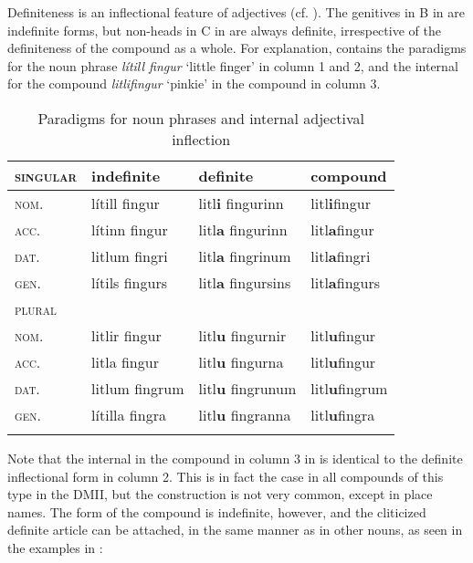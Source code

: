 \documentclass[output=paper]{LSP/langsci}
\begin{document}
\begin{xlist}
Definiteness is an inflectional feature of  adjectives (cf. ). The genitives in B in  are indefinite forms, but  non-heads in C in  are always definite, irrespective of the definiteness of the compound as a whole. For explanation,  contains the paradigms for the noun phrase \textit{lítill fingur} ‘little finger’ in column 1 and 2, and the internal  for the compound \textit{litlifingur} ‘pinkie’ in the compound in column 3. 

\begin{table}
\caption{Paradigms for noun phrases and internal adjectival inflection}
\label{tab:bjarnadottir:4}

\begin{tabularx}{\textwidth}{>{\scshape}lXXX}
\lsptoprule
\textup{singular} & indefinite & definite & compound\\
\midrule
nom. &  {lítill fingur} &  {litl}\textbf{{i}}  {fingurinn} 
&  {litl}\textbf{{i}}{fingur}\\
acc. &  {lítinn fingur} &  {litl}\textbf{{a}}  {fingurinn} 
&  {litl}\textbf{{a}}{fingur}\\
dat. &  {litlum fingri} &  {litl}\textbf{{a}}  {fingrinum} 
&  {litl}\textbf{{a}}{fingri}\\
gen. &  {lítils fingurs} &  {litl}\textbf{{a}}  {fingursins} 
&  {litl}\textbf{{a}}{fingurs}\\
\tablevspace
\textup{plural} &  &  & \\
\midrule
nom. &  {litlir fingur} &  {litl}\textbf{{u}}  {fingurnir} 
&  {litl}\textbf{{u}}{fingur}\\
acc. &  {litla fingur} &  {litl}\textbf{{u}}  {fingurna} 
&  {litl}\textbf{{u}}{fingur}\\
dat. &  {litlum fingrum} &  {litl}\textbf{{u}}  {fingrunum} 
&  {litl}\textbf{{u}}{fingrum}\\
gen. &  {lítilla fingra} &  {litl}\textbf{{u}}  {fingranna} 
&  {litl}\textbf{{u}}{fingra}\\
\lspbottomrule
\end{tabularx}
\end{table}

Note that the internal  in the compound in column 3 in  is identical to the definite inflectional form in column 2. This is in fact the case in all compounds of this type in the DMII, but the construction is not very common, except in place names. The form of the compound is indefinite, however, and the cliticized definite article can be attached, in the same manner as in other nouns, as seen in the examples in :


\end{xlist}
\end{document}

